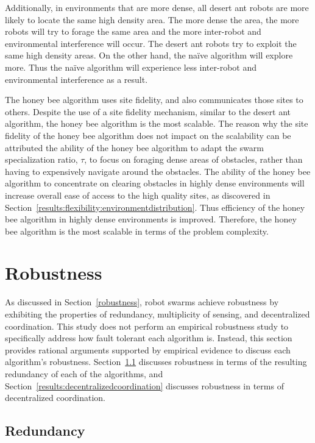 Additionally, in environments that are more dense, all desert ant robots are more likely to locate the same high density area. The more dense the area, the more robots will try to forage the same area and the more inter-robot and environmental interference will occur. The desert ant robots try to exploit the same high density areas. On the other hand, the na\"ive algorithm will explore more. Thus the na\"ive algorithm will experience less inter-robot and environmental interference as a result. 


The honey bee algorithm uses site fidelity, and also communicates those sites to others. Despite the use of a site fidelity mechanism, similar to the desert ant algorithm, the honey bee algorithm is the most scalable. The reason why the site fidelity of the honey bee algorithm does not impact on the scalability can be attributed the ability of the honey bee algorithm to adapt the swarm specialization ratio, $\tau$, to focus on foraging dense areas of obstacles, rather than having to expensively navigate around the obstacles. The ability of the honey bee algorithm to concentrate on clearing obstacles in highly dense environments will increase overall ease of access to the high quality sites, as discovered in Section~\ref{results:flexibility:environmentdistribution}. Thus efficiency of the honey bee algorithm in highly dense environments is improved. Therefore, the honey bee algorithm is the most scalable in terms of the problem complexity.



\section{Robustness}
\label{results:robustness}
As discussed in Section~\ref{robustness}, robot swarms achieve robustness by exhibiting the properties of redundancy, multiplicity of sensing, and decentralized coordination. This study does not perform an empirical robustness study to specifically address how fault tolerant each algorithm is. Instead, this section provides rational arguments supported by empirical evidence to discuss each algorithm's robustness. Section~\ref{results:redundancy} discusses robustness in terms of the resulting redundancy of each of the algorithms, and Section~\ref{results:decentralizedcoordination} discusses robustness in terms of decentralized coordination.

\subsection{Redundancy}
\label{results:redundancy}

